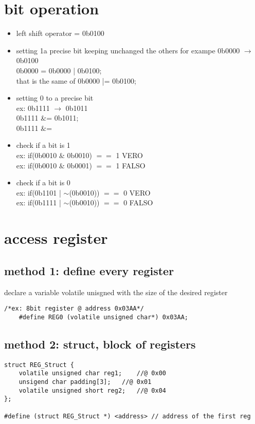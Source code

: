 \section{bit operation}
\begin{itemize}
	\item left shift operator  = 0b0100
	\item setting 1a precise bit keeping unchanged the others for exampe 0b0000 $\rightarrow$ 0b0100 \\
	0b0000 = 0b0000 | 0b0100; \\
	that is the same of
	0b0000 |= 0b0100; 
	

	\item setting 0 to a precise bit\\
		ex: 0b1111 $\rightarrow$ 0b1011 \\ 0b1111 \&= 0b1011; \\0b1111 $\&$= 
		
	\item check if a bit is 1 \\ 
	ex: if(0b0010 $\&$ 0b0010) $==$ 1   VERO \\	
	ex: if(0b0010 $\&$ 0b0001) $==$ 1   FALSO
	
	\item check if a bit is 0 \\
	ex: if(0b1101 | $\sim$(0b0010)) $==$ 0  VERO \\	
	ex: if(0b1111 | $\sim$(0b0010)) $==$ 0   FALSO \\	

	\end{itemize}

\section{access register}
\subsection{method 1: define every register}
declare a variable volatile unisgned with the size of the desired register\\
\begin{lstlisting}
/*ex: 8bit register @ address 0x03AA*/ 
	#define REG0 (volatile unsigned char*) 0x03AA;
\end{lstlisting}


\subsection{method 2: struct, block of registers}
\begin{lstlisting}
struct REG_Struct {
	volatile unsigned char reg1;	//@ 0x00
	unsigend char padding[3];	//@ 0x01
	volatile unsigned short reg2;	//@ 0x04
}; 

#define (struct REG_Struct *) <address> // address of the first reg
\end{lstlisting}

